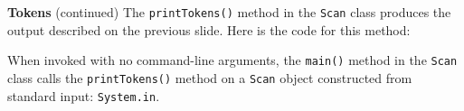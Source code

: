 \begin{minipage}[t]{\sw}
\slidenumber
\LARGE
{\bf Tokens} (continued)\exx
The \verb'printTokens()' method in the \verb'Scan' class
produces the output described on the previous slide.
Here is the code for this method:
{\Large
{}
}
When invoked with no command-line arguments,
the \verb'main()' method in the \verb'Scan' class
calls the \verb'printTokens()' method
on a \verb'Scan' object constructed
from standard input: \verb'System.in'.
\end{minipage}
\clearpage
